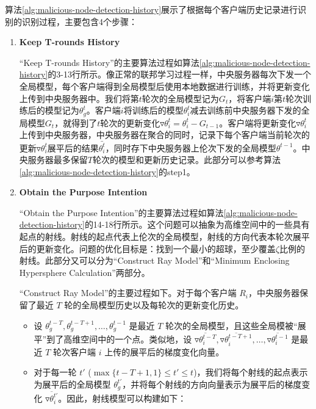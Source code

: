 \documentclass[lettersize,journal]{IEEEtran}
\begin{document}
算法\ref{alg:malicious-node-detection-history}展示了根据每个客户端历史记录进行识别的识别过程，主要包含4个步骤：

\begin{enumerate}

\item \textbf{Keep T-rounds History}

“Keep T-rounds History”的主要算法过程如算法\ref{alg:malicious-node-detection-history}的3-13行所示。像正常的联邦学习过程一样，中央服务器每次下发一个全局模型，每个客户端得到全局模型后使用本地数据进行训练，并将更新变化上传到中央服务器中。我们将第$t$轮次的全局模型记为$G_t$，将客户端$i$第$t$轮次训练后的模型记为$\theta^t_g$。客户端$i$将训练后的模型$\theta^t_{i}$减去训练前中央服务器下发的全局模型$G_t$，就得到了$t$轮次的更新变化$\triangledown \theta^t_{i}=\theta^t_{i}-G_{t-1}$。客户端将更新变化$\triangledown \theta^t_{i}$上传到中央服务器，中央服务器在聚合的同时，记录下每个客户端当前轮次的更新$\triangledown \theta^t_{i}$展平后的结果$\bar{\theta_i^t}$，同时存下中央服务器上伦次下发的全局模型$\theta^{t-1}$。中央服务器最多保留$T$轮次的模型和更新历史记录。此部分可以参考算法\ref{alg:malicious-node-detection-history}的step1。

\item \textbf{Obtain the Purpose Intention}

“Obtain the Purpose Intention”的主要算法过程如算法\ref{alg:malicious-node-detection-history}的14-18行所示。这个问题可以抽象为高维空间中的一些具有起点的射线。射线的起点代表上伦次的全局模型，射线的方向代表本轮次展平后的更新变化。问题的优化目标是：找到一个最小的超球，至少覆盖$\zeta$比例的射线。此部分又可以分为“Construct Ray Model”和“Minimum Enclosing Hypersphere Calculation”两部分。

“Construct Ray Model”的主要过程如下。对于每个客户端 \(R_i\)，中央服务器保留了最近 \(T\) 轮的全局模型历史以及每轮次的更新变化历史。

\begin{itemize}
    \item 设 \( \theta_g^{t-T}, \theta_g^{t-T+1}, \dots, \theta_g^{t-1} \) 是最近 \(T\) 轮次的全局模型，且这些全局模被“展平”到了高维空间中的一个点。类似地，设 \( \overline{\triangledown\theta_{i}^{t-T}}, \overline{\triangledown\theta_{i}^{t-T+1}}, \dots, \overline{\triangledown\theta_{i}^{t-1}} \) 是最近 \(T\) 轮次客户端 \(i\) 上传的展平后的梯度变化向量。
    \item 对于每一轮 \( t' \) (\( \max\{t-T+1, 1\}\leq  t'\leq t \))，我们将每个射线的起点表示为展平后的全局模型 \( \theta_g^{t'} \)，并将每个射线的方向向量表示为展平后的梯度变化 \( \overline{\triangledown\theta_{i}^{t'}} \)。因此，射线模型可以构建如下：


\end{itemize}
\end{enumerate}
\end{document}

